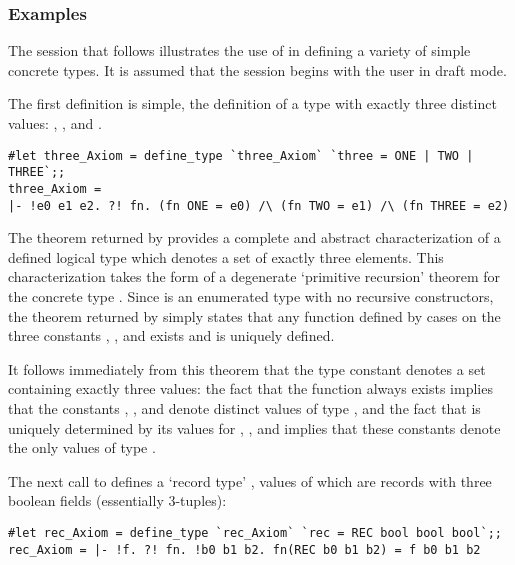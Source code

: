 \subsubsection{Examples}\label{define-type-example}

The session that follows illustrates the use of  in defining
a variety of simple concrete types.  It is assumed that the session begins
with the user in draft mode.

The first definition is simple, the definition of a type  with
exactly three distinct values: , , and .

\setcounter{sessioncount}{1}\label{types-session}
\begin{session}\begin{verbatim}
#let three_Axiom = define_type `three_Axiom` `three = ONE | TWO | THREE`;;
three_Axiom =
|- !e0 e1 e2. ?! fn. (fn ONE = e0) /\ (fn TWO = e1) /\ (fn THREE = e2)
\end{verbatim}\end{session}

\noindent The theorem returned by  provides a complete
and abstract characterization of
a defined logical type  which denotes a set of
exactly three elements.  This characterization takes the form of a
degenerate `primitive recursion'
 theorem for the concrete type .
Since  is an enumerated type with no recursive constructors,
the theorem returned by  simply
states that any function defined by cases on the three constants  ,
, and  exists and is uniquely defined.

It follows immediately from this theorem that the type constant 
denotes a set containing exactly three values: the fact that the function
 always exists implies that the constants , , and
 denote distinct values of type , and the fact that 
is uniquely determined by its values for , , and 
implies that these constants denote the only values of type .

The next call to  defines a `record type' , values of
which are records with three boolean fields (essentially 3-tuples):

\begin{session}\begin{verbatim}
#let rec_Axiom = define_type `rec_Axiom` `rec = REC bool bool bool`;;
rec_Axiom = |- !f. ?! fn. !b0 b1 b2. fn(REC b0 b1 b2) = f b0 b1 b2
\end{verbatim}\end{session}\label{rec-def}

